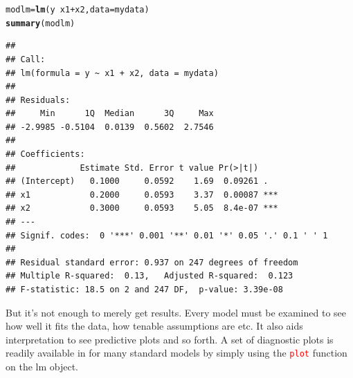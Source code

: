 \documentclass[english,nohyper,titlepage]{tufte-handout}\usepackage[]{graphicx}\usepackage[]{color}
\makeatletter
\newcommand{\hlopt}[1]{\textcolor[rgb]{0,0,0}{#1}}%
\newcommand{\hlstd}[1]{\textcolor[rgb]{0.345,0.345,0.345}{#1}}%
\newcommand{\hlkwb}[1]{\textcolor[rgb]{0.69,0.353,0.396}{#1}}%
\newcommand{\hlkwc}[1]{\textcolor[rgb]{0.333,0.667,0.333}{#1}}%
\newcommand{\hlkwd}[1]{\textcolor[rgb]{0.737,0.353,0.396}{\textbf{#1}}}%
\newenvironment{kframe}{%
 \def\at@end@of@kframe{}%
 \ifinner\ifhmode%
  \def\at@end@of@kframe{\end{minipage}}%
  \begin{minipage}{\columnwidth}%
 \fi\fi%
 \def\FrameCommand##1{\hskip\@totalleftmargin \hskip-\fboxsep
 \colorbox{shadecolor}{##1}\hskip-\fboxsep
     \hskip-\linewidth \hskip-\@totalleftmargin \hskip\columnwidth}%
 \MakeFramed {\advance\hsize-\width
   \@totalleftmargin\z@ \linewidth\hsize
   \@setminipage}}%
 {\par\unskip\endMakeFramed%
 \at@end@of@kframe}
\newenvironment{knitrout}{}{} %
\makeatother
\begin{document}
\begin{knitrout}\footnotesize
{}\color{fgcolor}\begin{kframe}
\begin{alltt}
\hlstd{modlm} \hlkwb{=} \hlkwd{lm}\hlstd{(y} \hlopt{~} \hlstd{x1} \hlopt{+} \hlstd{x2,} \hlkwc{data}\hlstd{=mydata)}
\hlkwd{summary}\hlstd{(modlm)}
\end{alltt}
\begin{verbatim}
## 
## Call:
## lm(formula = y ~ x1 + x2, data = mydata)
## 
## Residuals:
##     Min      1Q  Median      3Q     Max 
## -2.9985 -0.5104  0.0139  0.5602  2.7546 
## 
## Coefficients:
##             Estimate Std. Error t value Pr(>|t|)    
## (Intercept)   0.1000     0.0592    1.69  0.09261 .  
## x1            0.2000     0.0593    3.37  0.00087 ***
## x2            0.3000     0.0593    5.05  8.4e-07 ***
## ---
## Signif. codes:  0 '***' 0.001 '**' 0.01 '*' 0.05 '.' 0.1 ' ' 1
## 
## Residual standard error: 0.937 on 247 degrees of freedom
## Multiple R-squared:  0.13,	Adjusted R-squared:  0.123 
## F-statistic: 18.5 on 2 and 247 DF,  p-value: 3.39e-08
\end{verbatim}
\end{kframe}
\end{knitrout}

But it's not enough to merely get results.  Every model must be examined to see how well it fits the data, how tenable assumptions are etc.  It also aids interpretation to see predictive plots and so forth. A set of diagnostic plots is readily available in for many standard models by simply using the \texttt{\textcolor{red}{plot}} function on the lm object.
\end{document}
